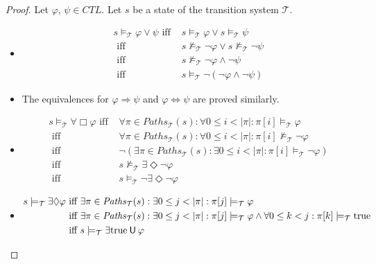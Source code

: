 \documentclass[12pt]{article}
\newcommand{\always}{\Box}
\newcommand{\eventually}{\Diamond}
\newcommand{\until}{\mathbin{\sf U}}
\newcommand{\TRUE}{\mbox{\lstinline{true}}}
\theoremstyle{definition}
\begin{document}
\begin{proof}
Let $\varphi$, $\psi \in \mathit{CTL}$.  Let $s$ be a state of the transition system $\mathcal{T}$.
\begin{itemize}
\item 
\begin{align*}
s \models_{\mathcal{T}} \varphi \vee \psi
\mbox{ iff } & s \models_{\mathcal{T}} \varphi \vee s \models_{\mathcal{T}} \psi\\
\mbox{ iff } & s \not\models_{\mathcal{T}} \neg \varphi \vee s \not\models_{\mathcal{T}} \neg \psi\\
\mbox{ iff } & s \not\models_{\mathcal{T}} \neg \varphi \wedge \neg \psi\\
\mbox{ iff } & s \models_{\mathcal{T}} \neg(\neg \varphi \wedge \neg \psi)
\end{align*}
\item
The equivalences for $\varphi \Rightarrow \psi$ and $\varphi \Leftrightarrow \psi$ are proved similarly.
\item
\begin{align*}
s \models_{\mathcal{T}} \forall \always \varphi
\mbox{ iff } & \forall \pi \in \mathit{Paths}_{\mathcal{T}}(s) : \forall 0 \leq i < |\pi| : \pi[i] \models_{\mathcal{T}} \varphi\\
\mbox{ iff } & \forall \pi \in \mathit{Paths}_{\mathcal{T}}(s) : \forall 0 \leq i < |\pi| : \pi[i] \not\models_{\mathcal{T}} \neg \varphi\\
\mbox{ iff } & \neg(\exists \pi \in \mathit{Paths}_{\mathcal{T}}(s) : \exists 0 \leq i < |\pi| : \pi[i] \models_{\mathcal{T}} \neg \varphi)\\
\mbox{ iff } & s \not\models_{\mathcal{T}} \exists \eventually \neg \varphi\\
\mbox{ iff } & s \models_{\mathcal{T}} \neg \exists \eventually \neg \varphi
\end{align*}
\item
\begin{align*}
s \models_{\mathcal{T}} \exists \eventually \varphi
\mbox{ iff } & \exists \pi \in \mathit{Paths}_{\mathcal{T}}(s) : \exists 0 \leq j < |\pi| : \pi[j] \models_{\mathcal{T}} \varphi\\
\mbox{ iff } & \exists \pi \in \mathit{Paths}_{\mathcal{T}}(s) : \exists 0 \leq j < |\pi| : \pi[j] \models_{\mathcal{T}} \varphi \wedge \forall 0 \leq k < j : \pi[k] \models_{\mathcal{T}} \TRUE\\
\mbox{ iff } & s \models_{\mathcal{T}} \exists \TRUE \until \varphi
\end{align*}

\end{itemize}
\end{proof}
\end{document}
